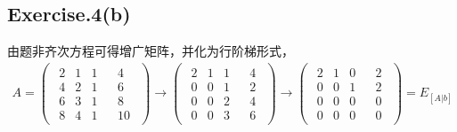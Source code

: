 \documentclass[UTF8,12pt, a4paper,fleqn]{ctexart}
\begin{document}
  \subsection*{Exercise.4(b)}
  由题非齐次方程可得增广矩阵，并化为行阶梯形式，\\
  \begin{equation*}
  \begin{split}
    A=\left(
      \begin{array}{c|c}
        \begin{matrix}
          2 & 1 & 1 \\
          4 & 2 & 1 \\
          6 & 3 & 1 \\
          8 & 4 & 1 
        \end{matrix} & 
        \begin{matrix}
          4 \\
          6 \\
          8 \\
          10
        \end{matrix}
      \end{array}
    \right) \rightarrow
    \left(
      \begin{array}{c|c}
        \begin{matrix}
          2 & 1 & 1 \\
          0 & 0 & 1 \\
          0 & 0 & 2 \\
          0 & 0 & 3 
        \end{matrix} & 
        \begin{matrix}
          4 \\
          2 \\
          4 \\
          6
        \end{matrix}
      \end{array}
    \right) \rightarrow
    \left(
      \begin{array}{c|c}
        \begin{matrix}
          2 & 1 & 0 \\
          0 & 0 & 1 \\
          0 & 0 & 0 \\
          0 & 0 & 0 
        \end{matrix} & 
        \begin{matrix}
          2 \\
          2 \\
          0 \\
          0
        \end{matrix}
      \end{array}
    \right)
    =E_{[A|b]}
  \end{split}
  \end{equation*}
\end{document}
